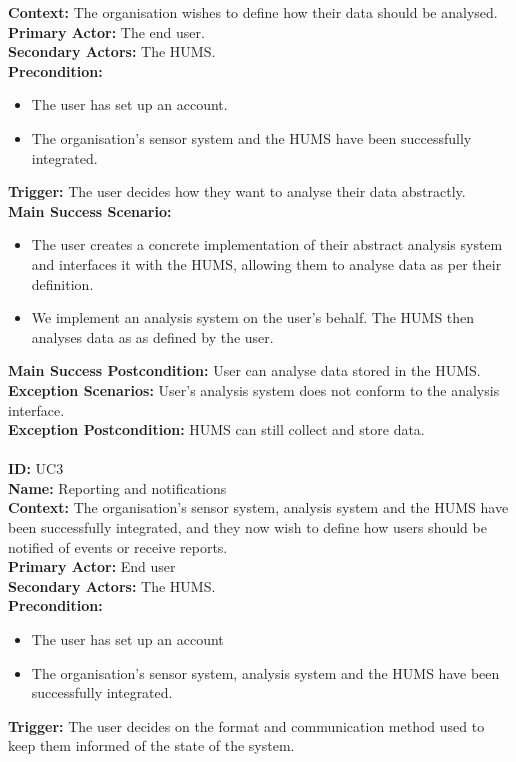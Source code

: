 \documentclass[10pt,a4paper]{article}
\begin{document}
\textbf{Context:} The organisation wishes to define how their data should be analysed.\\
\textbf{Primary Actor:} The end user.\\
\textbf{Secondary Actors:} The HUMS.\\
\textbf{Precondition:}
\begin{itemize}
\item The user has set up an account.
\item The organisation's sensor system and the HUMS have been successfully integrated.
\end{itemize}
\textbf{Trigger:} The user decides how they want to analyse their data abstractly.\\
\textbf{Main Success Scenario:}
\begin{itemize}
\item The user creates a concrete implementation of their abstract analysis system and interfaces it with the HUMS, allowing them to analyse data as per their definition.
\item We implement an analysis system on the user's behalf. The HUMS then analyses data as as defined by the user.
\end{itemize}
\textbf{Main Success Postcondition:} User can analyse data stored in the HUMS.\\
\textbf{Exception Scenarios:} User's analysis system does not conform to the analysis interface.\\
\textbf{Exception Postcondition:} HUMS can still collect and store data.\\\\
\noindent \textbf{ID:} UC3\\
\textbf{Name:} Reporting and notifications\\
\textbf{Context:} The organisation's sensor system, analysis system and the HUMS have been successfully integrated, and they now wish to define how users should be notified of events or receive reports.\\
\textbf{Primary Actor:} End user\\
\textbf{Secondary Actors:} The HUMS.\\
\textbf{Precondition:}
\begin{itemize}
\item The user has set up an account
\item The organisation's sensor system, analysis system and the HUMS have been successfully integrated.
\end{itemize}
\textbf{Trigger:} The user decides on the format and communication method used to keep them informed of the state of the system.\\
\end{document}
